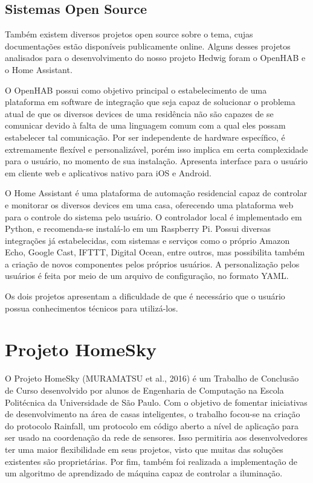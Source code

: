 \subsection{Sistemas Open Source}
Também existem diversos projetos open source sobre o tema, cujas documentações estão disponíveis publicamente online. Alguns desses projetos analisados para o desenvolvimento do nosso projeto Hedwig foram o OpenHAB e o Home Assistant.

O OpenHAB possui como objetivo principal o estabelecimento de uma plataforma em software de integração que seja capaz de solucionar o problema atual de que os diversos devices de uma residência não são capazes de se comunicar devido à falta de uma linguagem comum com a qual eles possam estabelecer tal comunicação. Por ser independente de hardware específico, é extremamente flexível e personalizável, porém isso implica em certa complexidade para o usuário, no momento de sua instalação. Apresenta interface para o usuário em cliente web e aplicativos nativo para iOS e Android.

O Home Assistant é uma plataforma de automação residencial capaz de controlar e monitorar os diversos devices em uma casa, oferecendo uma plataforma web para o controle do sistema pelo usuário. O controlador local é implementado em Python, e recomenda-se instalá-lo em um Raspberry Pi. Possui diversas integrações já estabelecidas, com sistemas e serviços como o próprio Amazon Echo, Google Cast, IFTTT, Digital Ocean, entre outros, mas possibilita também a criação de novos componentes pelos próprios usuários. A personalização pelos usuários é feita por meio de um arquivo de configuração, no formato YAML.

Os dois projetos apresentam a dificuldade de que é necessário que o usuário possua conhecimentos técnicos para utilizá-los.

\section{Projeto HomeSky}

O Projeto HomeSky (MURAMATSU et al., 2016) é um Trabalho de Conclusão de Curso desenvolvido por alunos de Engenharia de Computação na Escola Politécnica da Universidade de São Paulo. Com o objetivo de fomentar iniciativas de desenvolvimento na área de casas inteligentes, o trabalho focou-se na criação do protocolo Rainfall, um protocolo em código aberto a nível de aplicação para ser usado na coordenação da rede de sensores. Isso permitiria aos desenvolvedores ter uma maior flexibilidade em seus projetos, visto que muitas das soluções existentes são proprietárias. Por fim, também foi realizada a implementação de um algoritmo de aprendizado de máquina capaz de controlar a iluminação.

